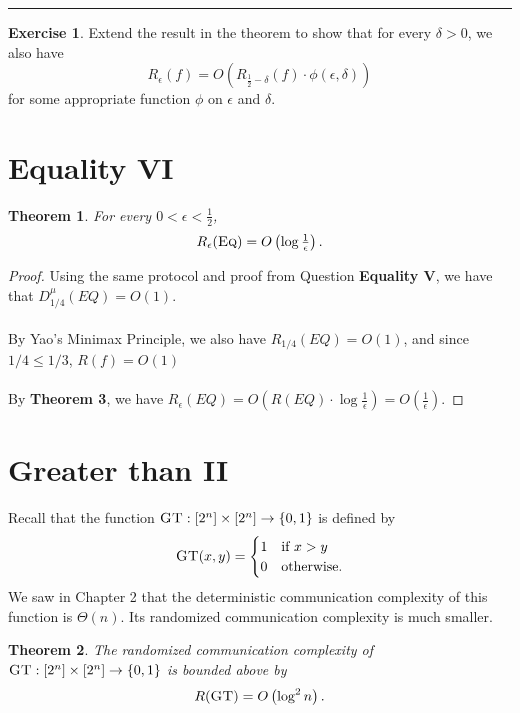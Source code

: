 \documentclass[11pt,oneside]{book}
\theoremstyle{plain}
\newtheorem{theorem}{Theorem}
\theoremstyle{definition}
\newtheorem{exercise}{Exercise}
\theoremstyle{plain}
\newcommand{\Eq}{\textsc{Eq}}
\newcommand{\GT}{\textsc{GT}}
\newcommand{\exercises}{\bigskip \noindent\rule{8cm}{0.4pt} \medskip}
\begin{document}
\exercises

\begin{exercise}
	Extend the result in the theorem to show that for every $\delta > 0$, we also have
	\[
	R_\epsilon(f) = O\left( R_{\frac12 - \delta}(f) \cdot \phi(\epsilon,\delta) \right)
	\]
	for some appropriate function $\phi$ on $\epsilon$ and $\delta$.
\end{exercise}


 
\section{Equality VI}


\begin{theorem}
	For every $0 < \epsilon < \frac12$,
	\[
	R_\epsilon(\Eq) = O\left(\log \tfrac1\epsilon \right).
	\]
\end{theorem}

\begin{proof}
	Using the same protocol and proof from Question \textbf{Equality V}, we have that $D_{1/4}^{\mu}(EQ) = O(1)$. \\
	\\
	By Yao's Minimax Principle, we also have $R_{1/4}(EQ) = O(1)$, and since $1/4 \leq 1/3$, $R(f) = O(1)$\\
	\\
	By \textbf{Theorem 3}, we have $R_{\epsilon}(EQ) = O(R(EQ) \cdot \log \frac{1}{\epsilon}) = O(\frac{1}{\epsilon})$.
\end{proof}


 
\section{Greater than II}

Recall that the function $\GT : [2^n] \times [2^n] \to \{0,1\}$ is defined by
\[
\GT(x,y) = \begin{cases}
1 & \mbox{if } x > y \\
0 & \mbox{otherwise.}
\end{cases}
\]
We saw in Chapter 2 that the deterministic communication complexity of this function is $\Theta(n)$. Its randomized communication complexity is much smaller.

\begin{theorem}
	The randomized communication complexity of $\GT : [2^n] \times [2^n] \to \{0,1\}$ is bounded above by
	\[
	R(\GT) = O\left(\log^2 n \right).
	\]
\end{theorem}
\end{document}
